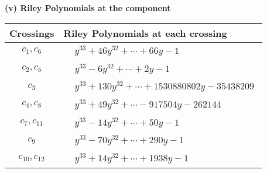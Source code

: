 \documentclass[1p]{elsarticle_modified}
\theoremstyle{definition}
\begin{document}
\flushleft \textbf{(v) Riley Polynomials at the component}\newline \\
\begin{tabular}{m{50pt}|m{274pt}}
Crossings & \hspace{64pt}Riley Polynomials at each crossing \\
\hline $$\begin{aligned}c_{1},c_{6}\end{aligned}$$&$\begin{aligned}
&y^{33}+46 y^{32}+\cdots+66 y-1
\end{aligned}$\\
\hline $$\begin{aligned}c_{2},c_{5}\end{aligned}$$&$\begin{aligned}
&y^{33}-6 y^{32}+\cdots+2 y-1
\end{aligned}$\\
\hline $$\begin{aligned}c_{3}\end{aligned}$$&$\begin{aligned}
&y^{33}+130 y^{32}+\cdots+1530880802 y-35438209
\end{aligned}$\\
\hline $$\begin{aligned}c_{4},c_{8}\end{aligned}$$&$\begin{aligned}
&y^{33}+49 y^{32}+\cdots-917504 y-262144
\end{aligned}$\\
\hline $$\begin{aligned}c_{7},c_{11}\end{aligned}$$&$\begin{aligned}
&y^{33}-14 y^{32}+\cdots+50 y-1
\end{aligned}$\\
\hline $$\begin{aligned}c_{9}\end{aligned}$$&$\begin{aligned}
&y^{33}-70 y^{32}+\cdots+290 y-1
\end{aligned}$\\
\hline $$\begin{aligned}c_{10},c_{12}\end{aligned}$$&$\begin{aligned}
&y^{33}+14 y^{32}+\cdots+1938 y-1
\end{aligned}$\\
\hline
\end{tabular}\\~\\
\end{document}
